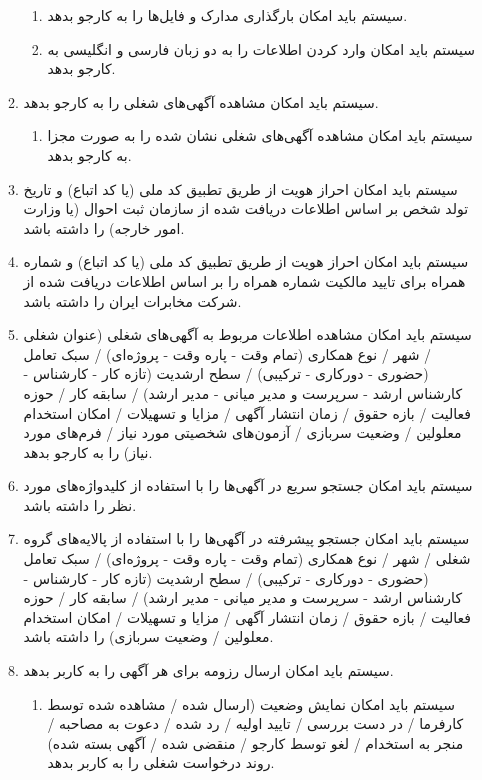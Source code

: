 \documentclass[12pt]{article}
\begin{document}
\begin{itemize}
\begin{enumerate}
\begin{enumerate}
				\item سیستم باید امکان بارگذاری مدارک و فایل‌‌ها را به کارجو بدهد.
				\item سیستم باید امکان وارد کردن اطلاعات را به دو زبان فارسی و انگلیسی به کارجو بدهد.
			\end{enumerate}
			\item سیستم باید امکان مشاهده آگهی‌های شغلی را به کارجو بدهد.
			\begin{enumerate}
				\renewcommand{\labelenumii}{-R\arabic{enumi}.\arabic{enumii}}
				\item سیستم باید امکان مشاهده آگهی‌های شغلی نشان شده را به صورت مجزا به کارجو بدهد.
			\end{enumerate}
			\item سیستم باید امکان احراز هویت از طریق تطبیق کد ملی (یا کد اتباع) و تاریخ تولد شخص بر اساس اطلاعات دریافت شده از سازمان ثبت احوال (یا وزارت امور خارجه) را داشته باشد.
			\item سیستم باید امکان احراز هویت از طریق تطبیق کد ملی (یا کد اتباع) و شماره همراه برای تایید مالکیت شماره همراه را بر اساس اطلاعات دریافت شده از شرکت مخابرات ایران را داشته باشد.
			\item سیستم باید امکان مشاهده اطلاعات مربوط به آگهی‌های شغلی (عنوان شغلی / شهر / نوع همکاری (تمام وقت - پاره وقت - پروژه‌ای) / سبک تعامل (حضوری - دورکاری - ترکیبی) / سطح ارشدیت (تازه کار - کارشناس - کارشناس ارشد - سرپرست و مدیر میانی - مدیر ارشد) / سابقه کار / حوزه فعالیت / بازه حقوق / زمان انتشار آگهی / مزایا و تسهیلات / امکان استخدام معلولین / وضعیت سربازی / آزمون‌های شخصیتی مورد نیاز / فرم‌های مورد نیاز) را به کارجو بدهد.
			\item سیستم باید امکان جستجو سریع در آگهی‌ها را با استفاده از کلیدواژه‌های مورد نظر را داشته باشد.
			\item سیستم باید امکان جستجو پیشرفته در آگهی‌ها را با استفاده از پالایه‌های گروه شغلی / شهر / نوع همکاری (تمام وقت - پاره وقت - پروژه‌ای) / سبک تعامل (حضوری - دورکاری - ترکیبی) / سطح ارشدیت (تازه کار - کارشناس - کارشناس ارشد - سرپرست و مدیر میانی - مدیر ارشد) / سابقه کار / حوزه فعالیت / بازه حقوق / زمان انتشار آگهی / مزایا و تسهیلات / امکان استخدام معلولین / وضعیت سربازی) را داشته باشد.
			\item سیستم باید امکان ارسال رزومه برای هر آگهی را به کاربر بدهد.
			\begin{enumerate}
				\renewcommand{\labelenumii}{-R\arabic{enumi}.\arabic{enumii}}
				\item سیستم باید امکان نمایش وضعیت (ارسال شده / مشاهده شده توسط کارفرما / در دست بررسی / تایید اولیه / رد شده / دعوت به مصاحبه / منجر به استخدام / لغو توسط کارجو / منقضی شده / آگهی بسته شده) روند درخواست شغلی را به کاربر بدهد.

\end{enumerate}
\end{enumerate}
\end{itemize}
\end{document}
